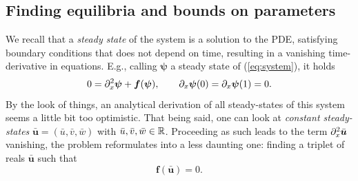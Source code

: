 \subsection{Finding equilibria and bounds on parameters}

We recall that a \textit{steady state} of the system is a solution to the PDE, satisfying boundary conditions that does not depend on time, resulting in a vanishing time-derivative in equations. E.g., calling $\bm\psi$ a steady state of (\ref{eq:system}), it holds
$$0 = \partial_x^2 \bm\psi + \bm f(\bm\psi), \qquad \partial_x \bm\psi(0) = \partial_x\bm\psi(1) = 0.$$
By the look of things, an analytical derivation of all steady-states of this system seems a little bit too optimistic. That being said, one can look at \textit{constant steady-states} $\bar{\bm u} = (\bar u, \bar v, \bar w)$ with $\bar u, \bar v, \bar w \in \mathbb{R}$. Proceeding as such leads to the term $\partial_x^2 \bar{\bm u}$ vanishing, the problem reformulates into a less daunting one: finding a triplet of reals $\bar{\bm u}$ such that
$$\bm f(\bar{\bm u}) = 0.$$


